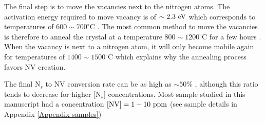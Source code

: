 \documentclass[a4paper, 11pt]{report}
\begin{document}
The final step is to move the vacancies next to the nitrogen atoms. The activation energy required to move vacancy is of $\sim 2.3\ \rm eV$ which corresponds to temperatures of $600\sim 700 ^\circ$C \citep{davies1992vacancy, newton2002recombination}. The most common method to move the vacancies is therefore to anneal the crystal at a temperature $800 \sim 1200 ^\circ$C for a few hours \citep{botsoa2011optimal}. When the vacancy is next to a nitrogen atom, it will only become mobile again for temperatures of $1400 \sim 1500 ^\circ$C \citep{zaitsev2013optical, pinto2012diffusion} which explains why the annealing process favors NV creation.

The final N$_s$ to NV conversion rate can be as high as $\sim 50 \%$ \citep{grezes2015storage, hartland2014study}, although this ratio tends to decrease for higher [N$_s$] concentrations. Most sample studied in this manuscript had a concentration $[\rm NV]= 1-10\ \rm ppm$ (see sample details in Appendix \ref{Appendix samples})
\end{document}
